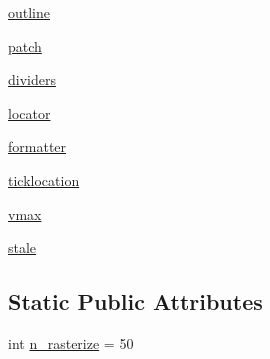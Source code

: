 \begin{DoxyCompactItemize}
\item 
\hyperlink{classmatplotlib_1_1colorbar_1_1ColorbarBase_a96e5fffc12214960751958562b770fab}{outline}
\item 
\hyperlink{classmatplotlib_1_1colorbar_1_1ColorbarBase_ae4846989c543bcc4becc43003d5b53c2}{patch}
\item 
\hyperlink{classmatplotlib_1_1colorbar_1_1ColorbarBase_acb4f92340ba408411055d89406f234d3}{dividers}
\item 
\hyperlink{classmatplotlib_1_1colorbar_1_1ColorbarBase_a822e940c1f112fd9f8eeff178cbbb9f6}{locator}
\item 
\hyperlink{classmatplotlib_1_1colorbar_1_1ColorbarBase_aacb49d10f5e6e7c2c3ee40d5a3c8dbfe}{formatter}
\item 
\hyperlink{classmatplotlib_1_1colorbar_1_1ColorbarBase_aaac704b6706e3d47e4697ddcfe03e54e}{ticklocation}
\item 
\hyperlink{classmatplotlib_1_1colorbar_1_1ColorbarBase_ae1dd3b927ec5bf9ebcce1e2301684643}{vmax}
\item 
\hyperlink{classmatplotlib_1_1colorbar_1_1ColorbarBase_a0da0cb2ee4920d20a461aec8125561d0}{stale}
\end{DoxyCompactItemize}
\subsection*{Static Public Attributes}
\begin{DoxyCompactItemize}
\item 
int \hyperlink{classmatplotlib_1_1colorbar_1_1ColorbarBase_af158e000c15cea4d5708e4fd3542d936}{n\+\_\+rasterize} = 50
\end{DoxyCompactItemize}


